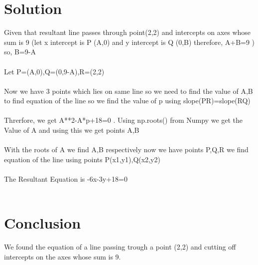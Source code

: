 \documentclass[journal,12pt,twocolumn]{IEEEtran}
\begin{document}
\section{Solution}
Given that resultant line passes through point(2,2) and intercepts on axes whose sum is 9 (let x intercept is P (A,0) and y intercept is Q (0,B) therefore, A+B=9 ) so, B=9-A  \\
\\
Let P=(A,0),Q=(0,9-A),R=(2,2)\\
\\
Now we have 3 points which lies on same line so we need to find the value of A,B to find equation of the line so we find the value of p using slope(PR)=slope(RQ)\\
\\
Threrfore, we get A**2-A*p+18=0 . Using np.roots() from Numpy we get the Value of A and using this we get points A,B\\
\\
With the roots of A we find A,B respectively now we have points P,Q,R we find equation of the line using points P(x1,y1),Q(x2,y2)\\
\\
The Resultant Equation is -6x-3y+18=0 \\
\\
\section{Conclusion}
We found the equation of a line passing trough a point
(2,2) and cutting off intercepts on the axes whose
sum is 9.
\end{document}
